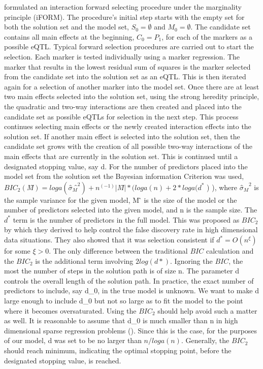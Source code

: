 \documentclass[]{book}
\theoremstyle{definition}
\theoremstyle{definition}
\theoremstyle{remark}
\begin{document}
\cite{hao2014interaction} formulated an interaction forward selecting
procedure under the marginality principle (iFORM). The procedure's
initial step starts with the empty set for both the solution set and the
model set, \(S_0=∅\) and \(M_0=∅\). The candidate set contains all main
effects at the beginning, \(C_0=P_1\), for each of the markers as a
possible eQTL. Typical forward selection procedures are carried out to
start the selection. Each marker is tested individually using a marker
regression. The marker that results in the lowest residual sum of
squares is the marker selected from the candidate set into the solution
set as an eQTL. This is then iterated again for a selection of another
marker into the model set. Once there are at least two main effects
selected into the solution set, using the strong heredity principle, the
quadratic and two-way interactions are then created and placed into the
candidate set as possible eQTLs for selection in the next step. This
process continues selecting main effects or the newly created
interaction effects into the solution set. If another main effect is
selected into the solution set, then the candidate set grows with the
creation of all possible two-way interactions of the main effects that
are currently in the solution set. This is continued until a designated
stopping value, say d. For the number of predictors placed into the
model set from the solution set the Bayesian information Criterion was
used, \(BIC_2 (M ̂ )=loga(σ ̂_M ̂^2 )+n^(-1) |M ̂ |*(loga(n)+2*loga(d^*\) )
), where \(σ ̂_M ̂^2\) is the sample variance for the given model,
\textbar{}M ̂ \textbar{} is the size of the model or the number of
predictors selected into the given model, and n is the sample size. The
\(d^*\) term is the number of predictors in the full model. This was
proposed as \(BIC_2\) by \cite{chen2008extended} which they derived to
help control the false discovery rate in high dimensional data
situations. They also showed that it was selection consistent if
\(d^*=O(n^ξ )\) for some \(ξ>0\). The only difference between the
traditional \(BIC\) calculation and the \(BIC_2\) is the additional term
involving \(2log(d*)\). Ignoring the \(BIC\), the most the number of
steps in the solution path is of size n. The parameter d controls the
overall length of the solution path. In practice, the exact number of
predictors to include, say d\_0, in the true model is unknown. We want
to make d large enough to include d\_0 but not so large as to fit the
model to the point where it becomes oversaturated. Using the \(BIC_2\)
should help avoid such a matter as well. It is reasonable to assume that
d\_0 is much smaller than n in high dimensional sparse regression
problems (\cite{fan2008sure}). Since this is the case, for the purposes
of our model, d was set to be no larger than \(n/loga(n)\). Generally,
the \(BIC_2\) should reach minimum, indicating the optimal stopping
point, before the designated stopping value, is reached.
\end{document}
